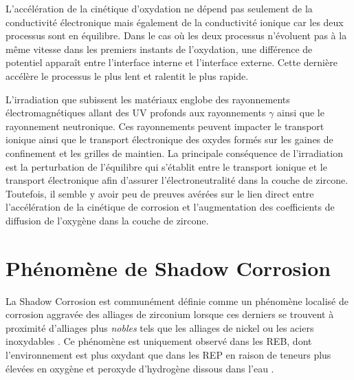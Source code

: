 \begin{refsection}
        L'accélération de la cinétique d'oxydation ne dépend pas seulement de la conductivité électronique mais
        également de la conductivité ionique car les deux processus sont en équilibre. Dans le cas où les deux processus
        n'évoluent pas à la même vitesse dans les
        premiers instants de l'oxydation, une différence de potentiel apparaît entre l'interface interne et l'interface
        externe. Cette dernière accélère le processus le plus lent et ralentit le plus rapide.
        
        L’irradiation que subissent les matériaux englobe des rayonnements électromagnétiques allant des UV profonds aux
        rayonnements $\gamma$ ainsi que le rayonnement neutronique. Ces rayonnements peuvent impacter le transport ionique
        ainsi que le transport électronique des oxydes formés sur les gaines de confinement et les grilles de maintien. 
        La principale conséquence de l'irradiation est la perturbation de l'équilibre qui s'établit entre le transport
        ionique et le transport électronique afin d'assurer l'électroneutralité dans la couche de zircone. Toutefois, il
        semble y avoir peu de preuves avérées sur le lien direct entre l’accélération de la cinétique de corrosion et 
        l’augmentation des coefficients de diffusion de l’oxygène dans la couche de zircone.
        



\section{Phénomène de Shadow Corrosion}\label{sec:shadow_corrosion}

La Shadow Corrosion est communément définie comme un phénomène localisé de corrosion aggravée des alliages de zirconium
lorsque ces derniers se trouvent à proximité d'alliages plus \emph{nobles} tels que les alliages de nickel ou les aciers
inoxydables \citep{Chen1994}. Ce phénomène est uniquement observé dans les REB, dont
l'environnement est plus oxydant que dans les REP en raison de teneurs plus élevées
en oxygène et peroxyde d'hydrogène dissous dans l'eau \citep{Adamson2002}.


\end{refsection}
